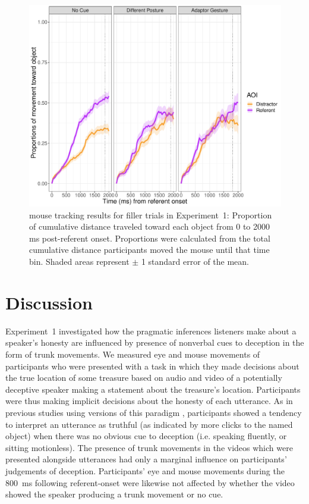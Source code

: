 \documentclass[a4paper,man,natbib]{apa6}
\begin{document}
\begin{figure}[Ht]
  \centering
	\includegraphics[width=\linewidth]{./img/e7_mouse_filler.pdf}
  \caption{mouse tracking results for filler trials in Experiment~1: Proportion of cumulative distance traveled toward each object from 0 to 2000 ms post-referent onset. Proportions were calculated from the total cumulative distance participants moved the mouse until that time bin. Shaded areas represent $\pm$ 1 standard error of the mean.}
  \label{fig:v1_mouse2}
\end{figure}

\section{Discussion}
Experiment~1 investigated how the pragmatic inferences listeners make about a speaker's honesty are influenced by presence of nonverbal cues to deception in the form of trunk movements.
We measured eye  and mouse  movements of participants who were presented with a task in which they made decisions about the true location of some treasure based on audio and video of a potentially deceptive speaker making a statement about the treasure's location.
Participants were thus making implicit decisions about the honesty of each utterance.
As in previous studies using versions of this paradigm \citep{Loy2017, King2018}, participants showed a tendency to interpret an utterance as truthful (as indicated by more clicks to the named object) when there was no obvious cue to deception (i.e. speaking fluently, or sitting motionless).
The presence of trunk movements in the videos which were presented alongside utterances had only a marginal influence on participants' judgements of deception.
Participants' eye  and mouse  movements during the 800~ms following referent-onset were likewise not affected by whether the video showed the speaker producing a trunk movement or no cue.
\end{document}

